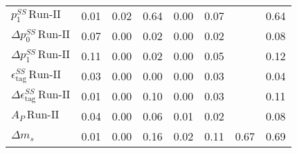 \begin{tabular}{l  c  c  c  c  c  c  | c }
$p_{1}^{SS} \, \text{Run-II}$ & 0.01 & 0.02 & 0.64 & 0.00 & 0.07 &  & 0.64 \\ 
$\Delta p_{0}^{SS} \, \text{Run-II}$ & 0.07 & 0.00 & 0.02 & 0.00 & 0.02 &  & 0.08 \\ 
$\Delta p_{1}^{SS} \, \text{Run-II}$ & 0.11 & 0.00 & 0.02 & 0.00 & 0.05 &  & 0.12 \\ 
$\epsilon_{\text{tag}}^{SS} \, \text{Run-II}$ & 0.03 & 0.00 & 0.00 & 0.00 & 0.03 &  & 0.04 \\ 
$\Delta \epsilon_{\text{tag}}^{SS} \, \text{Run-II}$ & 0.01 & 0.00 & 0.10 & 0.00 & 0.03 &  & 0.11 \\ 
$A_{P} \, \text{Run-II}$ & 0.04 & 0.00 & 0.06 & 0.01 & 0.02 &  & 0.08 \\ 
$\Delta m_{s}$ & 0.01 & 0.00 & 0.16 & 0.02 & 0.11 & 0.67 & 0.69 \\ 
\hline
\hline
\end{tabular}
